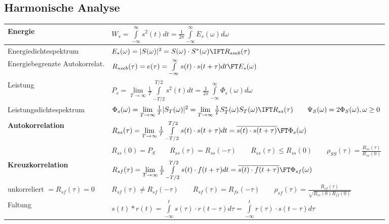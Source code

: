 \subsection{Harmonische Analyse}
\begin{tabular}{|l|l|}
     \hline
    Energie
        & $ W_s = \int\limits_{-\infty}^{\infty} s^2 (t) dt = \frac {1}{2 \pi} \int\limits_{-\infty}^{\infty} E_s(\omega) d\omega$ \\
    \hline
    Energiedichtespektrum 
        & $E_s(\omega) = | S(\omega) |^2 = S(\omega) \cdot S^*(\omega) \IFT R_{sseb}(\tau) $ \\
    \hline
    Energiebegrenzte Autokorrelat.
        & $R_{sseb} (\tau) = e(\tau) = \int\limits_{-\infty}^{\infty} s (t) \cdot s(t+\tau) dt \FT E_s(\omega)$ \\
    \hline
    Leistung
        & $ P_s =  \lim\limits_{T \rightarrow \infty} \frac 1T \int\limits_{-T/2}^{T/2} s^2 (t) dt = \frac {1}{2 \pi} \int\limits_{-\infty}^{\infty} \Phi_s(\omega) d\omega$ \\
    \hline
    Leistungsdichtespektrum 
        & $\Phi_s(\omega) = \lim\limits_{T \rightarrow \infty} \frac 1T  | S_T(\omega) |^2 = \lim\limits_{T \rightarrow \infty} \frac 1T  S_T^*(\omega) S_T(\omega)  \IFT R_{ss}(\tau)
        \qquad \Psi_S(\omega) = 2 \Phi_S(\omega), \omega \geq 0$ \\
    \hline
    \textbf{Autokorrelation}
        & $R_{ss} (\tau) = \lim\limits_{T \rightarrow \infty} \frac 1T \int\limits_{-T/2}^{T/2} s (t) \cdot s(t+\tau) dt = \overline{s(t) \cdot s(t+\tau)} \FT
        \Phi_s(\omega)$ \\ & $R_{ss} (0) = P_S \qquad R_{ss} (\tau) = R_{ss} (-\tau) \qquad R_{ss} (\tau) \leq R_{ss} (0) \qquad \rho_{SS}(\tau) = \frac {R_{ss} (\tau)}{R_{ss} (0)} $\\
    \hline
    \textbf{Kreuzkorrelation}
        & $R_{sf} (\tau) = \lim\limits_{T \rightarrow \infty} \frac 1T \int\limits_{-T/2}^{T/2} s (t) \cdot f(t+\tau) dt = \overline{s(t) \cdot f(t+\tau)} \FT \Phi_{sf}(\omega)$ \\
    \quad unkorreliert $ = R_{sf} (\tau) = 0$   & $R_{sf} (\tau) \neq R_{sf} (-\tau) \qquad R_{sf} (\tau) = R_{fs} (-\tau) \qquad \rho_{sf}(\tau) = \frac {R_{sf}(\tau)
        }{\sqrt{R_{ss}(0)  R_{ff}(0) }} $ \\
				\hline
		Faltung & $s(t)*r(t)=\int\limits_{-\infty}^t{s(\tau)\cdot r(t-\tau) d\tau}=\int\limits_{-\infty}^t{r(\tau)\cdot s(t-\tau) d\tau}$\\

\end{tabular}
